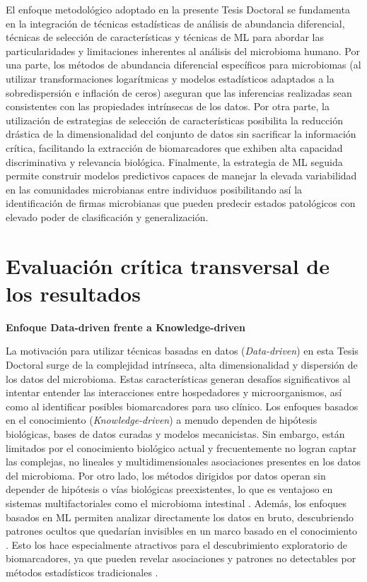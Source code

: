 El enfoque metodológico adoptado en la presente Tesis Doctoral se fundamenta en la integración de técnicas estadísticas de análisis de abundancia diferencial, técnicas de selección de características y técnicas de ML para abordar las particularidades y limitaciones inherentes al análisis del microbioma humano. Por una parte, los métodos de abundancia diferencial específicos para microbiomas (al utilizar transformaciones logarítmicas y modelos estadísticos adaptados a la sobredispersión e inflación de ceros) aseguran que las inferencias realizadas sean consistentes con las propiedades intrínsecas de los datos. Por otra parte, la utilización de estrategias de selección de características posibilita la reducción drástica de la dimensionalidad del conjunto de datos sin sacrificar la información crítica, facilitando la extracción de biomarcadores que exhiben alta capacidad discriminativa y relevancia biológica. Finalmente, la estrategia de ML seguida permite construir modelos predictivos capaces de manejar la elevada variabilidad en las comunidades microbianas entre individuos posibilitando así la identificación de firmas microbianas que pueden predecir estados patológicos con elevado poder de clasificación y generalización.


\section{Evaluación crítica transversal de los resultados}

\textbf{Enfoque Data-driven frente a Knowledge-driven}

La motivación para utilizar técnicas basadas en datos (\textit{Data-driven}) en esta Tesis Doctoral surge de la complejidad intrínseca, alta dimensionalidad y dispersión de los datos del microbioma. Estas características generan desafíos significativos al intentar entender las interacciones entre hospedadores y microorganismos, así como al identificar posibles biomarcadores para uso clínico. Los enfoques basados en el conocimiento (\textit{Knowledge-driven}) a menudo dependen de hipótesis biológicas, bases de datos curadas y modelos mecanicistas. Sin embargo, están limitados por el conocimiento biológico actual y frecuentemente no logran captar las complejas, no lineales y multidimensionales asociaciones presentes en los datos del microbioma. Por otro lado, los métodos dirigidos por datos operan sin depender de hipótesis o vías biológicas preexistentes, lo que es ventajoso en sistemas multifactoriales como el microbioma intestinal \cite{dakal2025advanced}. Además, los enfoques basados en ML permiten analizar directamente los datos en bruto, descubriendo patrones ocultos que quedarían invisibles en un marco basado en el conocimiento \cite{dreisbach2023comparison}. Esto los hace especialmente atractivos para el descubrimiento exploratorio de biomarcadores, ya que pueden revelar asociaciones y patrones no detectables por métodos estadísticos tradicionales \cite{hemmati2024using}.


